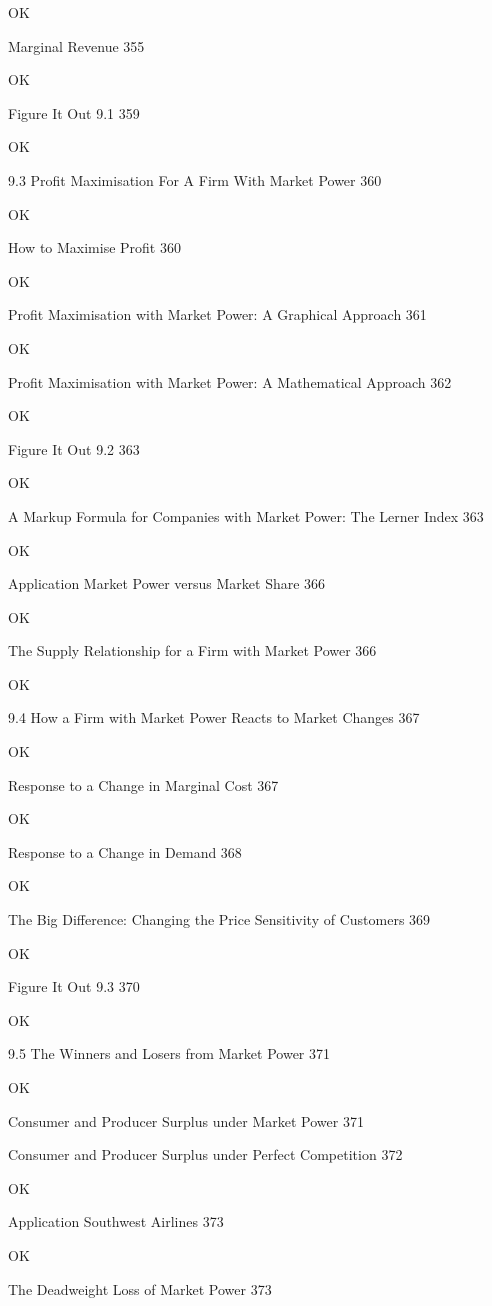 OK

Marginal Revenue 355

OK

Figure It Out 9.1 359

OK

9.3 Profit Maximisation For A Firm With Market Power 360

OK

How to Maximise Profit 360

OK

Profit Maximisation with Market Power: A Graphical Approach 361

OK

Profit Maximisation with Market Power: A Mathematical Approach 362

OK

Figure It Out 9.2 363

OK

A Markup Formula for Companies with Market Power: The Lerner Index 363

OK

Application Market Power versus Market Share 366

OK

The Supply Relationship for a Firm with Market Power 366

OK

9.4 How a Firm with Market Power Reacts to Market Changes 367

OK

Response to a Change in Marginal Cost 367

OK

Response to a Change in Demand 368

OK

The Big Difference: Changing the Price Sensitivity of Customers 369

OK

Figure It Out 9.3 370

OK

9.5 The Winners and Losers from Market Power 371

OK

Consumer and Producer Surplus under Market Power 371



Consumer and Producer Surplus under Perfect Competition 372

OK

Application Southwest Airlines 373

OK

The Deadweight Loss of Market Power 373

